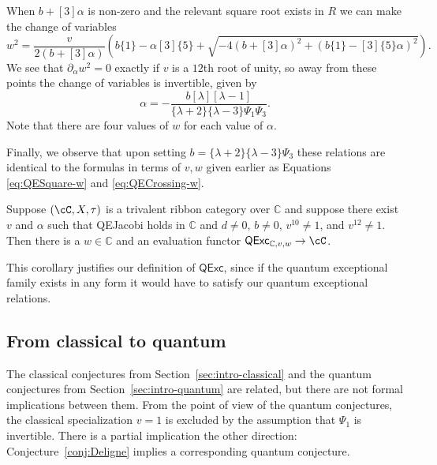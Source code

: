 \documentclass[12pt]{amsart}
\begin{document}
When $b+[3]\alpha$ is non-zero and the relevant square root exists in $R$ we can make the change of variables
\begin{equation}\label{eq:change-variables}
  w^2 = \frac{v}{2(b+[3]\alpha)}\left(b \{1\} -\alpha [3] \{5\} + \sqrt{-4 (b+[3]\alpha)^2 + (b \{1\} -[3]\{5\}\alpha)^2} \right).
\end{equation}
We see that $\partial_\alpha w^2 = 0$ exactly if $v$ is a $12$th root of
unity, so away from these points the change of variables is invertible, given
by
$$\alpha =  -\frac{b[\lambda][\lambda-1]}{\{\lambda+2\}\{\lambda-3\}\Psi_1\Psi_3}.$$
Note that there are four values of $w$ for each value of $\alpha$.

Finally, we observe that upon setting $b =
\{\lambda+2\}\{\lambda-3\}\Psi_3$ these relations are identical to
the formulas in terms of $v,w$ given earlier as Equations
\eqref{eq:QESquare-w} and \eqref{eq:QECrossing-w}.

\begin{corollary}
Suppose $(\cC, X, \tau)$ is a trivalent ribbon category over $\mathbb{C}$ and
suppose there exist $v$ and $\alpha$ such that QEJacobi holds in $\mathbb{C}$
and $d \neq 0 $, $b \neq 0$, $v^{10} \neq 1$, and $v^{12} \neq 1$.  Then there
is a $w \in \mathbb{C}$ and an evaluation functor
$\mathsf{QExc}_{\mathbb{C},v,w} \rightarrow \cC$.
\end{corollary}

This corollary justifies our definition of $\mathsf{QExc}$, since if the
quantum exceptional family exists in any form it would have to satisfy our
quantum exceptional relations.

\subsection{From classical to quantum}
The classical conjectures from Section~\ref{sec:intro-classical} and
the quantum conjectures from Section~\ref{sec:intro-quantum} are
related, but there are not formal implications between them. From the point of view
of the quantum conjectures, the classical specialization $v=1$ is excluded
by the assumption that $\Psi_1$ is invertible. There
is a partial implication the other direction: Conjecture~\ref{conj:Deligne}
implies a corresponding quantum conjecture.
\end{document}
